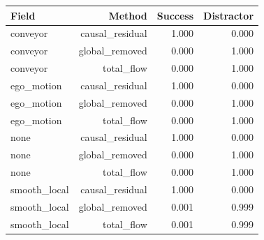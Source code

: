 \begin{tabular}{lrrr}
\toprule
Field & Method & Success & Distractor\\
\midrule
conveyor & causal\_residual & 1.000 & 0.000\\
conveyor & global\_removed & 0.000 & 1.000\\
conveyor & total\_flow & 0.000 & 1.000\\
ego\_motion & causal\_residual & 1.000 & 0.000\\
ego\_motion & global\_removed & 0.000 & 1.000\\
ego\_motion & total\_flow & 0.000 & 1.000\\
none & causal\_residual & 1.000 & 0.000\\
none & global\_removed & 0.000 & 1.000\\
none & total\_flow & 0.000 & 1.000\\
smooth\_local & causal\_residual & 1.000 & 0.000\\
smooth\_local & global\_removed & 0.001 & 0.999\\
smooth\_local & total\_flow & 0.001 & 0.999\\
\bottomrule
\end{tabular}
